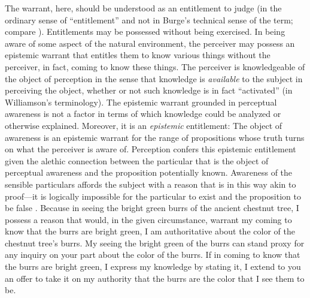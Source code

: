 The warrant, here, should be understood as an entitlement to judge (in the ordinary sense of ``entitlement'' and not in Burge's \citeyear{Burge:2003fk} technical sense of the term; compare \citealt[132n]{McDowell:2009ys}). Entitlements may be possessed without being exercised. In being aware of some aspect of the natural environment, the perceiver may possess an epistemic warrant that entitles them to know various things without the perceiver, in fact, coming to know these things. The perceiver is knowledgeable of the object of perception in the sense that knowledge is \emph{available} to the subject in perceiving the object, whether or not such knowledge is in fact ``activated'' (in Williamson's \citeyear{Williamson:1990uq} terminology). The epistemic warrant grounded in perceptual awareness is not a factor in terms of which knowledge could be analyzed or otherwise explained. Moreover, it is an \emph{epistemic} entitlement: The object of awareness is an epistemic warrant for the range of propositions whose truth turns on what the perceiver is aware of. Perception confers this epistemic entitlement given the alethic connection between the particular that is the object of perceptual awareness and the proposition potentially known. Awareness of the sensible particulars affords the subject with a reason that is in this way akin to proof---it is logically impossible for the particular to exist and the proposition to be false \citep[see][]{Cook-Wilson:1926sf,Kalderon:2010fk,Travis:2005kx}. Because in seeing the bright green burrs of the ancient chestnut tree, I possess a reason that would, in the given circumstance, warrant my coming to know that the burrs are bright green, I am authoritative about the color of the chestnut tree's burrs. My seeing the bright green of the burrs can stand proxy for any inquiry on your part about the color of the burrs. If in coming to know that the burrs are bright green, I express my knowledge by stating it, I extend to you an offer to take it on my authority that the burrs are the color that I see them to be. 


